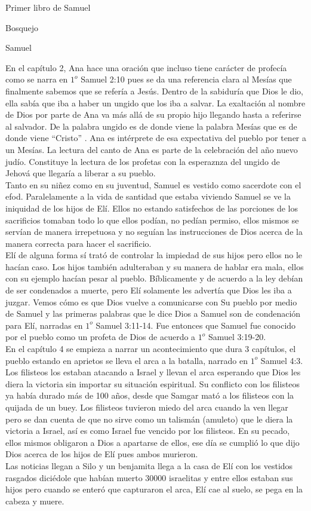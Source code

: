 \begin{section}{Primer libro de Samuel}
\begin{subsection}{Bosquejo}
\begin{subsubsection}{Samuel}
\begin{enumerate}
 En el capítulo 2, Ana hace una oración que incluso tiene carácter de profecía como se narra en $1^{o}$ Samuel 2:10 pues se da una referencia clara al Mesías que finalmente sabemos que se refería a Jesús. Dentro de la sabiduría que Dios le dio, ella sabía que iba a haber un ungido  que los iba a salvar. La exaltación al nombre de Dios por parte de Ana va más allá de su propio hijo llegando hasta a referirse al salvador. De la palabra ungido es de donde viene la palabra Mesías que es de donde viene ``Cristo'' . Ana es intérprete de esa expectativa del pueblo por tener a un Mesías. La lectura del canto de Ana es parte de la celebración del año nuevo judío. Constituye la lectura de los profetas con la esperaznza del ungido de Jehová que llegaría a liberar a su pueblo.\\
 Tanto en su niñez como en su juventud, Samuel es vestido como sacerdote con el efod. Paralelamente a la vida de santidad que estaba viviendo Samuel se ve la iniquidad de los hijos de Elí. Ellos no estando satisfechos de las porciones de los sacrificios tomaban todo lo que ellos podían, no pedían permiso, ellos mismos se servían de manera irrepetuosa y no seguían las instrucciones de Dios acerca de la manera correcta para hacer el sacrificio.\\
Elí de alguna forma sí trató de controlar la impiedad de sus hijos pero ellos no le hacían caso. Los hijos también adulteraban y su manera de hablar era mala, ellos con su ejemplo hacían pesar al pueblo. 
\newpage
Bíblicamente y de acuerdo a la ley debían de ser condenados a muerte, pero Elí solamente les advertía que Dios les iba a juzgar. Vemos cómo es que Dios vuelve a comunicarse con Su pueblo por medio de Samuel y las primeras palabras que le dice Dios a Samuel son de condenación para Elí, narradas en $1^{o}$ Samuel 3:11-14. Fue entonces que Samuel fue conocido por el pueblo como un profeta de Dios de acuerdo a $1^{o}$ Samuel 3:19-20.\\
En el capítulo 4 se empieza a narrar un acontecimiento que dura 3 capítulos, el pueblo estando en aprietos se lleva el arca a la batalla, narrado en $1^{o}$ Samuel 4:3. Los filisteos los estaban atacando a Israel y llevan el arca esperando que Dios les diera la victoria sin importar su situación espiritual. Su conflicto con los filisteos ya había durado más de 100 años, desde que Samgar mató a los filisteos con la quijada de un buey. Los filisteos tuvieron miedo del arca cuando la ven llegar pero se dan cuenta de que no sirve como un talismán (amuleto) que le diera la victoria a Israel, así es como Israel fue vencido por los filisteos. En su pecado, ellos mismos obligaron a Dios a apartarse de ellos, ese día se cumplió lo que dijo Dios acerca de los hijos de Elí pues ambos murieron. \\
Las noticias llegan a Silo y un benjamita llega a la casa de Elí con los vestidos rasgados diciédole que habían muerto 30000 israelitas y entre ellos estaban sus hijos pero cuando se enteró que capturaron el arca, Elí cae al suelo, se pega en la cabeza y muere.\\
 

\end{enumerate}
\end{subsubsection}
\end{subsection}
\end{section}
